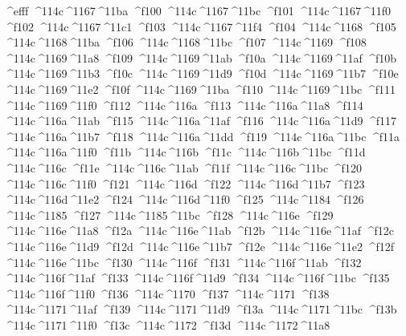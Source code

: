 \checkit ^^^^efff ^^^^114c^^^^1167^^^^11ba
\checkit ^^^^f100 ^^^^114c^^^^1167^^^^11bc
\checkit ^^^^f101 ^^^^114c^^^^1167^^^^11f0
\checkit ^^^^f102 ^^^^114c^^^^1167^^^^11c1
\checkit ^^^^f103 ^^^^114c^^^^1167^^^^11f4
\checkit ^^^^f104 ^^^^114c^^^^1168
\checkit ^^^^f105 ^^^^114c^^^^1168^^^^11ba
\checkit ^^^^f106 ^^^^114c^^^^1168^^^^11bc
\checkit ^^^^f107 ^^^^114c^^^^1169
\checkit ^^^^f108 ^^^^114c^^^^1169^^^^11a8
\checkit ^^^^f109 ^^^^114c^^^^1169^^^^11ab
\checkit ^^^^f10a ^^^^114c^^^^1169^^^^11af
\checkit ^^^^f10b ^^^^114c^^^^1169^^^^11b3
\checkit ^^^^f10c ^^^^114c^^^^1169^^^^11d9
\checkit ^^^^f10d ^^^^114c^^^^1169^^^^11b7
\checkit ^^^^f10e ^^^^114c^^^^1169^^^^11e2
\checkit ^^^^f10f ^^^^114c^^^^1169^^^^11ba
\checkit ^^^^f110 ^^^^114c^^^^1169^^^^11bc
\checkit ^^^^f111 ^^^^114c^^^^1169^^^^11f0
\checkit ^^^^f112 ^^^^114c^^^^116a
\checkit ^^^^f113 ^^^^114c^^^^116a^^^^11a8
\checkit ^^^^f114 ^^^^114c^^^^116a^^^^11ab
\checkit ^^^^f115 ^^^^114c^^^^116a^^^^11af
\checkit ^^^^f116 ^^^^114c^^^^116a^^^^11d9
\checkit ^^^^f117 ^^^^114c^^^^116a^^^^11b7
\checkit ^^^^f118 ^^^^114c^^^^116a^^^^11dd
\checkit ^^^^f119 ^^^^114c^^^^116a^^^^11bc
\checkit ^^^^f11a ^^^^114c^^^^116a^^^^11f0
\checkit ^^^^f11b ^^^^114c^^^^116b
\checkit ^^^^f11c ^^^^114c^^^^116b^^^^11bc
\checkit ^^^^f11d ^^^^114c^^^^116c
\checkit ^^^^f11e ^^^^114c^^^^116c^^^^11ab
\checkit ^^^^f11f ^^^^114c^^^^116c^^^^11bc
\checkit ^^^^f120 ^^^^114c^^^^116c^^^^11f0
\checkit ^^^^f121 ^^^^114c^^^^116d
\checkit ^^^^f122 ^^^^114c^^^^116d^^^^11b7
\checkit ^^^^f123 ^^^^114c^^^^116d^^^^11e2
\checkit ^^^^f124 ^^^^114c^^^^116d^^^^11f0
\checkit ^^^^f125 ^^^^114c^^^^1184
\checkit ^^^^f126 ^^^^114c^^^^1185
\checkit ^^^^f127 ^^^^114c^^^^1185^^^^11bc
\checkit ^^^^f128 ^^^^114c^^^^116e
\checkit ^^^^f129 ^^^^114c^^^^116e^^^^11a8
\checkit ^^^^f12a ^^^^114c^^^^116e^^^^11ab
\checkit ^^^^f12b ^^^^114c^^^^116e^^^^11af
\checkit ^^^^f12c ^^^^114c^^^^116e^^^^11d9
\checkit ^^^^f12d ^^^^114c^^^^116e^^^^11b7
\checkit ^^^^f12e ^^^^114c^^^^116e^^^^11e2
\checkit ^^^^f12f ^^^^114c^^^^116e^^^^11bc
\checkit ^^^^f130 ^^^^114c^^^^116f
\checkit ^^^^f131 ^^^^114c^^^^116f^^^^11ab
\checkit ^^^^f132 ^^^^114c^^^^116f^^^^11af
\checkit ^^^^f133 ^^^^114c^^^^116f^^^^11d9
\checkit ^^^^f134 ^^^^114c^^^^116f^^^^11bc
\checkit ^^^^f135 ^^^^114c^^^^116f^^^^11f0
\checkit ^^^^f136 ^^^^114c^^^^1170
\checkit ^^^^f137 ^^^^114c^^^^1171
\checkit ^^^^f138 ^^^^114c^^^^1171^^^^11af
\checkit ^^^^f139 ^^^^114c^^^^1171^^^^11d9
\checkit ^^^^f13a ^^^^114c^^^^1171^^^^11bc
\checkit ^^^^f13b ^^^^114c^^^^1171^^^^11f0
\checkit ^^^^f13c ^^^^114c^^^^1172
\checkit ^^^^f13d ^^^^114c^^^^1172^^^^11a8
